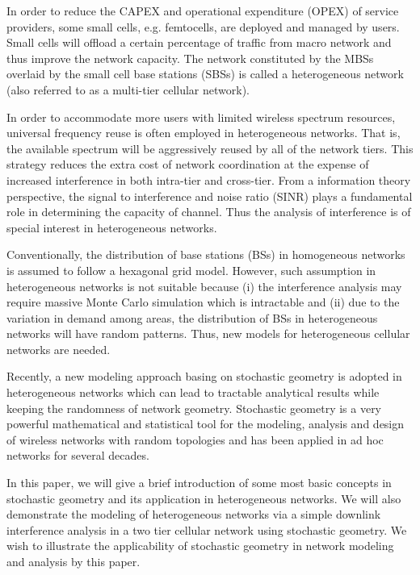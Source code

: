 \documentclass[a4paper,twocolumn]{IEEEtran}
\begin{document}
In order to reduce the CAPEX and operational expenditure (OPEX) of service providers, some small cells, e.g. femtocells, are deployed and managed by users. Small cells will offload a certain percentage of traffic from macro network and thus improve the network capacity. The network constituted by the MBSs overlaid by the small cell base stations (SBSs) is called a heterogeneous network (also referred to as a multi-tier cellular network).

In order to accommodate more users with limited wireless spectrum resources, universal frequency reuse is often employed in heterogeneous networks\cite{Lin2011, Andrews2012JSAC}. That is, the available spectrum will be aggressively reused by all of the network tiers. This strategy reduces the extra cost of network coordination at the expense of increased interference in both intra-tier and cross-tier. From a information theory perspective, the signal to interference and noise ratio (SINR) plays a fundamental role in determining the capacity of channel. Thus the analysis of interference is of special interest in heterogeneous networks.

Conventionally, the distribution of base stations (BSs) in homogeneous networks is assumed to follow a hexagonal grid model. However, such assumption in heterogeneous networks is not suitable because (i) the interference analysis may require massive Monte Carlo simulation\cite{Gilhousen1991} which is intractable and (ii) due to the variation in demand among areas, the distribution of BSs in heterogeneous networks will have random patterns. Thus, new models for heterogeneous cellular networks are needed.

Recently, a new modeling approach basing on stochastic geometry is adopted in heterogeneous networks which can lead to tractable analytical results while keeping the randomness of network geometry. Stochastic geometry is a very powerful mathematical and statistical tool for the modeling, analysis and design of wireless networks with random topologies and has been applied in ad hoc networks for several decades\cite{Haenggi2013Book, Haenggi2009JSAC, Baccelli2009Vol1, Baccelli2009Vol2, Cardieri2010}.

In this paper, we will give a brief introduction of some most basic concepts in stochastic geometry and its application in heterogeneous networks. We will also demonstrate the modeling of heterogeneous networks via a simple downlink interference analysis in a two tier cellular network using stochastic geometry. We wish to illustrate the applicability of stochastic geometry in network modeling and analysis by this paper.
\end{document}
